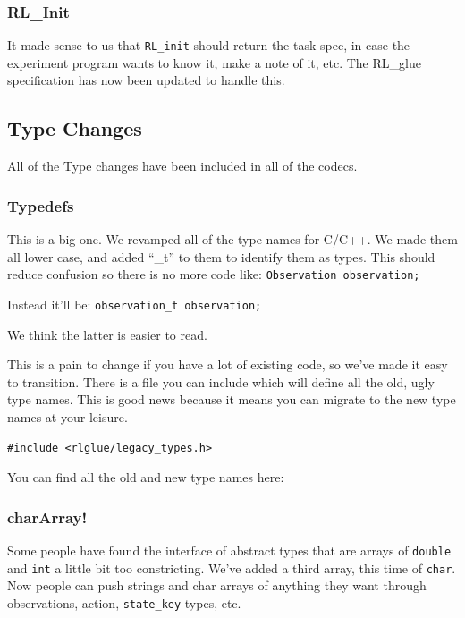 \documentclass[11pt]{article}
\begin{document}
\subsubsection{RL\_Init}
It made sense to us that \texttt{RL\_init} should return the task spec, in case the experiment program wants to know it, make a note of it, etc. The RL\_glue specification has now been updated to handle this.

\subsection{Type Changes}
All of the Type changes have been included in all of the codecs.

\subsubsection{Typedefs}
This is a big one. We revamped all of the type names for C/C++.  We made them all lower case, and added ``\_t'' to them to identify them as types.  This should reduce confusion so there is no more code like:\newline
\texttt{Observation observation;}

Instead it'll be:\newline
\texttt{observation\_t observation;}

We think the latter is easier to read.

This is a pain to change if you have a lot of existing code, so we've made it easy to transition.  There is a file you can include which will define all the old, ugly type names. This is good news because it means you can migrate to the new type names at your leisure.
\begin{verbatim}
#include <rlglue/legacy_types.h>
\end{verbatim}

You can find all the old and new type names here:\newline
{}

\subsubsection{charArray!}
Some people have found the interface of abstract types that are arrays of \texttt{double} and \texttt{int} a little bit too constricting.  We've added a third array, this time of \texttt{char}.  Now people can push strings and char arrays of anything they want through observations, action, \texttt{state\_key} types, etc.
\end{document}
